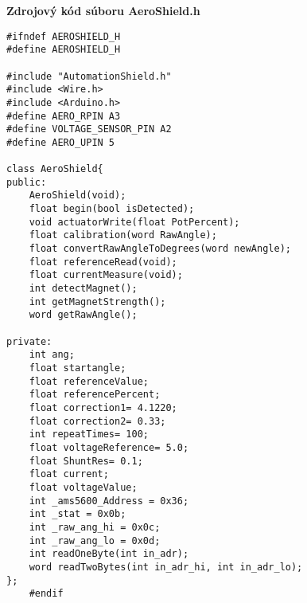 \LARGE\bf{Zdrojový kód súboru AeroShield.h}
\vspace{1cm}
\begin{lstlisting}[caption={Zdrojový kód súboru AeroShield.h.},captionpos=b]	
#ifndef AEROSHIELD_H			 
#define AEROSHIELD_H	
	
#include "AutomationShield.h" 
#include <Wire.h>              
#include <Arduino.h>			 
#define AERO_RPIN A3        
#define VOLTAGE_SENSOR_PIN A2   
#define AERO_UPIN 5   
	
class AeroShield{		    	               
public:
	AeroShield(void);
	float begin(bool isDetected);                                       
	void actuatorWrite(float PotPercent);          
	float calibration(word RawAngle);          
	float convertRawAngleToDegrees(word newAngle);  
	float referenceRead(void);
	float currentMeasure(void);
	int detectMagnet();	
	int getMagnetStrength();
	word getRawAngle();

private:
	int ang;                                        
	float startangle;                              
	float referenceValue;               
	float referencePercent;              
	float correction1= 4.1220;			
	float correction2= 0.33;			
	int repeatTimes= 100;				
	float voltageReference= 5.0;		
	float ShuntRes= 0.1;				
	float current;						
	float voltageValue;				
	int _ams5600_Address = 0x36;	
	int _stat = 0x0b;				
	int _raw_ang_hi = 0x0c;		
	int _raw_ang_lo = 0x0d;		
	int readOneByte(int in_adr);	
	word readTwoBytes(int in_adr_hi, int in_adr_lo); 
};
	#endif
\end{lstlisting}